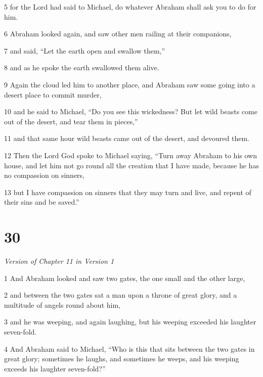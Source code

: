 \par 5 for the Lord had said to Michael, do whatever Abraham shall ask you to do for him. 

\par 6 Abraham looked again, and saw other men railing at their companions, 

\par 7 and said, “Let the earth open and swallow them,” 

\par 8 and as he spoke the earth swallowed them alive. 

\par 9 Again the cloud led him to another place, and Abraham saw some going into a desert place to commit murder, 

\par 10 and he said to Michael, “Do you see this wickedness? But let wild beasts come out of the desert, and tear them in pieces,” 

\par 11 and that same hour wild beasts came out of the desert, and devoured them. 

\par 12 Then the Lord God spoke to Michael saying, “Turn away Abraham to his own house, and let him not go round all the creation that I have made, because he has no compassion on sinners, 

\par 13 but I have compassion on sinners that they may turn and live, and repent of their sins and be saved.”

\chapter{30}

\par \textit{Version of Chapter 11 in Version 1}

\par 1 And Abraham looked and saw two gates, the one small and the other large, 

\par 2 and between the two gates sat a man upon a throne of great glory, and a multitude of angels round about him, 

\par 3 and he was weeping, and again laughing, but his weeping exceeded his laughter seven-fold. 

\par 4 And Abraham said to Michael, “Who is this that sits between the two gates in great glory; sometimes he laughs, and sometimes he weeps, and his weeping exceeds his laughter seven-fold?” 

